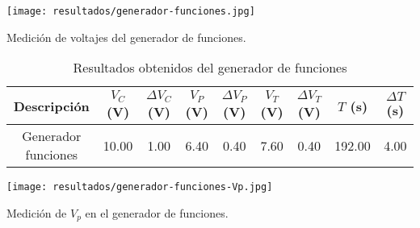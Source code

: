 \FloatBarrier

\begin{ilustracion}[ht]
    \centering
    \texttt{[image: resultados/generador-funciones.jpg]}
    \caption{Medición de voltajes del generador de funciones.}
    \label{ilus:generador-funciones}
\end{ilustracion}

\begin{table}[ht]
\centering
\begin{tabular}{|c|c|c|c|c|c|c|c|c|}
\hline
Descripción & $V_C$ (V) & $\Delta V_C$ (V) & $V_P$ (V) & $\Delta V_P$ (V) & $V_T$ (V) & $\Delta V_T$ (V) & $T$ (s) & $\Delta T$ (s) \\ \hline
Generador funciones & 10.00 & 1.00 & 6.40 & 0.40 & 7.60 & 0.40 & 192.00 & 4.00 \\ \hline
\end{tabular}
\caption{Resultados obtenidos del generador de funciones}
\label{tab:resultados}
\end{table}

\begin{ilustracion}
    \centering
    \texttt{[image: resultados/generador-funciones-Vp.jpg]}
    \caption{Medición de $V_p$ en el generador de funciones.}
    \label{ilus:generador-funciones-Vp}
\end{ilustracion}
